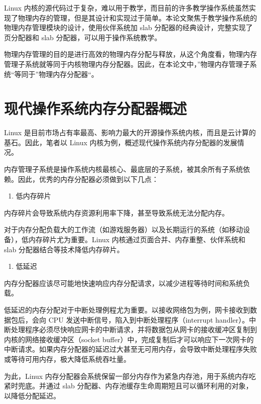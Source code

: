 \documentclass[AutoFakeBold]{LZUThesis}
\newcommand{\tightlist}{%
  \setlength{\itemsep}{0pt}\setlength{\parskip}{0pt}}
\begin{document}
\begin{sloppypar}
Linux
内核的源代码过于复杂，难以用于教学，而目前的许多教学操作系统虽然实现了物理内存的管理，但是其设计和实现过于简单。本论文聚焦于教学操作系统的物理内存管理模块的设计，使用伙伴系统加
slab 分配器的经典设计，完整实现了页分配器和 slab
分配器，可以用于操作系统教学。

物理内存管理的目的是进行高效的物理内存分配与释放，从这个角度看，物理内存管理子系统就等同于内核物理内存分配器。因此，在本论文中，''物理内存管理子系统``等同于''物理内存分配器``。


\section{现代操作系统内存分配器概述}

Linux
是目前市场占有率最高、影响力最大的开源操作系统内核，而且是云计算的基石。因此，笔者以
Linux 内核为例，概述现代操作系统内存分配器的发展情况。

内存管理子系统是操作系统内核最核心、最底层的子系统，被其余所有子系统依赖。因此，优秀的内存分配器必须做到以下几点：

\begin{enumerate}
\def\labelenumi{\arabic{enumi}.}
\tightlist
\item
  低内存碎片
\end{enumerate}

内存碎片会导致系统内存资源利用率下降，甚至导致系统无法分配内存。

对于内存分配负载大的工作流（如游戏服务器）以及长期运行的系统（如移动设备），低内存碎片尤为重要。Linux
内核通过页面合并、内存重整、伙伴系统和 slab
分配器结合等技术降低内存碎片。

\begin{enumerate}
\def\labelenumi{\arabic{enumi}.}
\setcounter{enumi}{1}
\tightlist
\item
  低延迟
\end{enumerate}

内存分配器应该尽可能地快速响应内存分配请求，以减少进程等待时间和系统负载。

低延迟的内存分配对于中断处理例程尤为重要。以接收网络包为例，网卡接收到数据包后，会向
CPU 发送中断信号，陷入到中断处理程序（interrupt
handler）。中断处理程序必须尽快响应网卡的中断请求，并将数据包从网卡的接收缓冲区复制到内核的网络接收缓冲区（socket
buffer）中，完成复制后才可以响应下一次网卡的中断请求。如果内存分配器的延迟过大甚至无可用内存，会导致中断处理程序失败或等待可用内存，极大降低系统吞吐量。

为此，Linux
内存分配器会系统保留一部分内存作为紧急内存池，用于系统内存吃紧时兜底。并通过
slab 分配器、内存池缓存生命周期短且可以循环利用的对象，以降低分配延迟。


\end{sloppypar}
\end{document}
